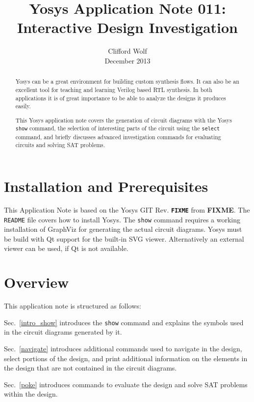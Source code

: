 \documentclass[9pt,technote,a4paper]{IEEEtran}
\def\FIXME{{\color{red}\bf FIXME}}
\begin{document}
\title{Yosys Application Note 011: \\ Interactive Design Investigation}
\author{Clifford Wolf \\ December 2013}
\maketitle

\begin{abstract}
Yosys \cite{yosys} can be a great environment for building custom synthesis
flows. It can also be an excellent tool for teaching and learning Verilog based
RTL synthesis. In both applications it is of great importance to be able to
analyze the designs it produces easily.

This Yosys application note covers the generation of circuit diagrams with the
Yosys {\tt show} command, the selection of interesting parts of the circuit
using the {\tt select} command, and briefly discusses advanced investigation
commands for evaluating circuits and solving SAT problems.
\end{abstract}

\section{Installation and Prerequisites}

This Application Note is based on the Yosys \cite{yosys} GIT Rev. {\tt \FIXME} from
\FIXME{}. The {\tt README} file covers how to install Yosys. The
{\tt show} command requires a working installation of GraphViz \cite{graphviz}
for generating the actual circuit diagrams. Yosys must be build with Qt
support for the built-in SVG viewer. Alternatively an external viewer can be
used, if Qt is not available.

\section{Overview}

This application note is structured as follows:

Sec.~\ref{intro_show} introduces the {\tt show} command and explains the
symbols used in the circuit diagrams generated by it.

Sec.~\ref{navigate} introduces additional commands used to navigate in the
design, select portions of the design, and print additional information on
the elements in the design that are not contained in the circuit diagrams.

Sec.~\ref{poke} introduces commands to evaluate the design and solve SAT
problems within the design.
\end{document}
